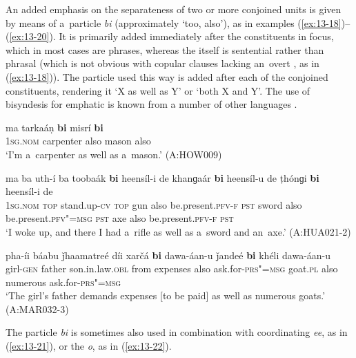  An added emphasis on the separateness of two or more conjoined units is given by means of a~particle \textit{bi} (approximately `too, also'), as in examples (\ref{ex:13-18})--(\ref{ex:13-20}). It is primarily added immediately after the constituents in focus, which in most cases are  phrases, whereas the  itself is sentential rather than phrasal (which is not obvious with copular clauses lacking an~overt , as in (\ref{ex:13-18})). The particle used this way is added after each of the conjoined constituents, rendering it `X as well as Y' or `both X and Y'. The use of bisyndesis for emphatic  is known from a number of other languages \citep[15--17]{haspelmath2007}. 

\begin{exe}
\ex
\label{ex:13-18}
\gll ma {\ob}tarkaáṇ \textbf{bi} misrí \textbf{bi}{\cb}\\
\textsc{1sg.nom} carpenter also mason also \\
\glt `I'm a~carpenter as well as a~mason.' (A:HOW009)

\ex
\label{ex:13-19}
\gll ma ba uth-í ba {\ob}toobaák \textbf{bi} heensíl-i de khanɡaár \textbf{bi} heensíl-u de ṭhónɡi \textbf{bi} heensíl-i de{\cb}\\
\textsc{1sg.nom} \textsc{top} stand.up-\textsc{cv} \textsc{top} gun also  be.present.\textsc{pfv-f} \textsc{pst} sword also be.present.\textsc{pfv"=msg } \textsc{pst} axe also be.present.\textsc{pfv-f } \textsc{pst} \\
\glt `I woke up, and there I had a~rifle as well as a~sword and an~axe.' (A:HUA021-2)

\ex
\label{ex:13-20}
\gll pha-íi báabu ǰhaamatreé díi {\ob}xarčá \textbf{bi} dawa-áan-u ǰandeé \textbf{bi} khéli dawa-áan-u{\cb}\\
girl-\textsc{gen} father son.in.law.\textsc{obl} from expenses also  ask.for-\textsc{prs"=msg} goat.\textsc{pl} also numerous ask.for-\textsc{prs"=msg} \\
\glt `The girl's father demands expenses [to be paid] as well as numerous goats.' (A:MAR032-3) 
\end{exe}

The particle \textit{bi} is sometimes also used in combination with coordinating \textit{ee}, as in (\ref{ex:13-21}), or the  \textit{o}, as in (\ref{ex:13-22}).

